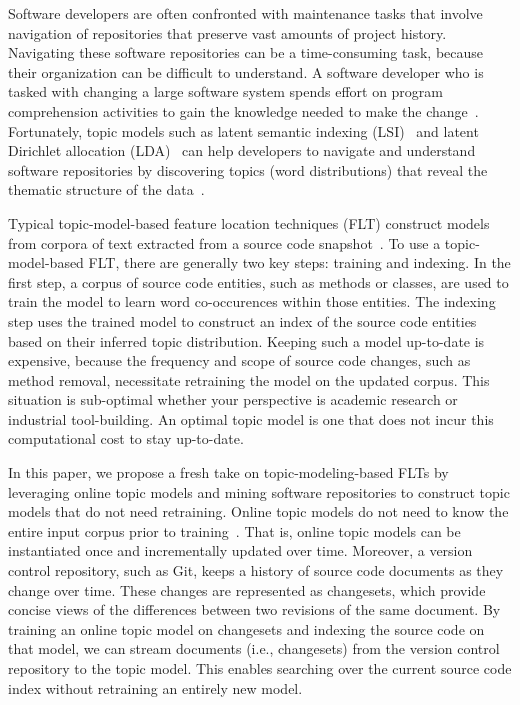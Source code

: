 
Software developers are often confronted with maintenance tasks that involve navigation of repositories that preserve vast amounts of project history.
Navigating these software repositories can be a time-consuming task, because their organization can be difficult to understand.
A software developer who is tasked with changing a large software system spends effort on program comprehension activities to gain the knowledge needed to make the change~\cite{Corbi:1989}.
Fortunately, topic models such as
latent semantic indexing (LSI)~\cite{Deerwester-etal:1990} and
latent Dirichlet allocation (LDA)~\cite{Blei-etal:2003}
can help developers to navigate and understand software repositories
by discovering topics (word distributions) that reveal the thematic structure
of the data~\cite{Linstead-etal:2007,Thomas-etal:2011,Hindle-etal:2012}.

Typical topic-model-based feature location techniques (FLT) construct models from corpora of text extracted from a source code snapshot~\cite{Dit-etal:2013b}.
To use a topic-model-based FLT, there are generally two key steps: training and indexing.
In the first step, a corpus of source code entities, such as methods or classes, are used to train the model to learn word co-occurences within those entities.
The indexing step uses the trained model to construct an index of the source code entities based on their inferred topic distribution.
Keeping such a model up-to-date is expensive, because the frequency and scope of source code changes, such as method removal, necessitate retraining the model on the updated corpus.
This situation is sub-optimal whether your perspective is academic research or industrial tool-building.
An optimal topic model is one that does not incur this computational cost to stay up-to-date.

In this paper, we propose a fresh take on topic-modeling-based FLTs by leveraging online topic models and mining software repositories to construct topic models that do not need retraining.
Online topic models do not need to know the entire input corpus prior to training~\cite{Hoffman-etal:2010,Radim:2011}.
That is, online topic models can be instantiated once and incrementally updated over time.
Moreover, a version control repository, such as Git, keeps a history of source code documents as they change over time.
These changes are represented as changesets, which provide concise views of the differences between two revisions of the same document.
By training an online topic model on changesets and indexing the source code on that model, we can stream documents (i.e., changesets) from the version control repository to the topic model.
This enables searching over the current source code index without retraining an entirely new model.

